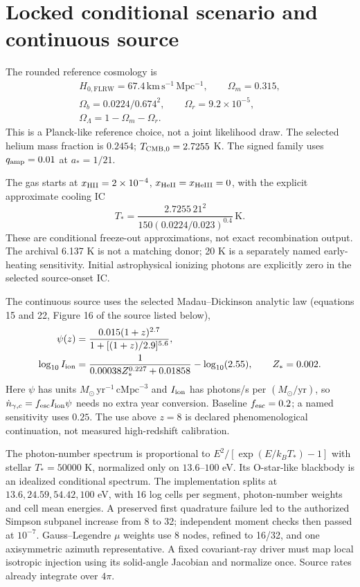 \documentclass[11pt]{article}
\begin{document}
\section{Locked conditional scenario and continuous source}
The rounded reference cosmology is
\begin{gather*}
H_{0,\mathrm{FLRW}}=67.4\,\mathrm{km\,s^{-1}\,Mpc^{-1}},\qquad \Omega_m=0.315,\\
\Omega_b=0.0224/0.674^2,\qquad \Omega_r=9.2\times10^{-5},\\
\Omega_\Lambda=1-\Omega_m-\Omega_r.
\end{gather*}
 This is a Planck-like reference choice, not a joint likelihood draw. The selected helium mass fraction is $0.2454$; $T_{\rm CMB,0}=2.7255$ K. The signed family uses $q_{\rm amp}=0.01$ at $a_*=1/21$.

The gas starts at $x_{\rm HII}=2\times10^{-4}$, $x_{\rm HeII}=x_{\rm HeIII}=0$, with the explicit approximate cooling IC
\begin{equation}
T_*=\frac{2.7255\,21^2}{150(0.0224/0.023)^{0.4}}\,\mathrm K.
\end{equation}
These are conditional freeze-out approximations, not exact recombination output. The archival 6.137 K is not a matching donor; 20 K is a separately named early-heating sensitivity. Initial astrophysical ionizing photons are explicitly zero in the selected source-onset IC.

The continuous source uses the selected Madau--Dickinson analytic law (equations 15 and 22, Figure 16 of the source listed below),
\begin{align}
\psi(z)&=\frac{0.015(1+z)^{2.7}}{1+[(1+z)/2.9]^{5.6}},\\
\log_{10}I_{\rm ion}&=\frac{1}{0.00038Z_*^{0.227}+0.01858}-\log_{10}(2.55),\qquad Z_*=0.002.
\end{align}
Here $\psi$ has units $M_\odot\,\mathrm{yr}^{-1}\,\mathrm{cMpc}^{-3}$ and $I_{\rm ion}$ has photons/s per $(M_\odot/\mathrm{yr})$, so $\dot n_{\gamma,c}=f_{\rm esc}I_{\rm ion}\psi$ needs no extra year conversion. Baseline $f_{\rm esc}=0.2$; a named sensitivity uses $0.25$. The use above $z=8$ is declared phenomenological continuation, not measured high-redshift calibration.

The photon-number spectrum is proportional to $E^2/[\exp(E/k_BT_*)-1]$ with stellar $T_*=50000$ K, normalized only on $13.6$--$100$ eV. Its O-star-like blackbody is an idealized conditional spectrum. The implementation splits at $13.6,24.59,54.42,100$ eV, with 16 log cells per segment, photon-number weights and cell mean energies. A preserved first quadrature failure led to the authorized Simpson subpanel increase from 8 to 32; independent moment checks then passed at $10^{-7}$. Gauss--Legendre $\mu$ weights use 8 nodes, refined to 16/32, and one axisymmetric azimuth representative. A fixed covariant-ray driver must map local isotropic injection using its solid-angle Jacobian and normalize once. Source rates already integrate over $4\pi$.
\end{document}
